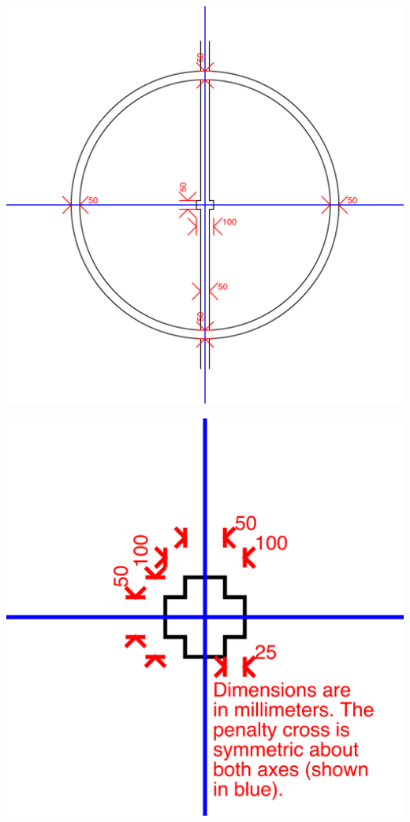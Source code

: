 \documentclass[12pt]{article}
\begin{document}
\clearpage
\centerline{\includegraphics[angle=90,origin=c,width=0.5\columnwidth]{figs/fieldDimensions2020_technical_cc.pdf}}

\centerline{\includegraphics[origin=c,width=0.5\columnwidth]{figs/fieldDimensions2020_technical_pc.pdf}}

\end{document}
